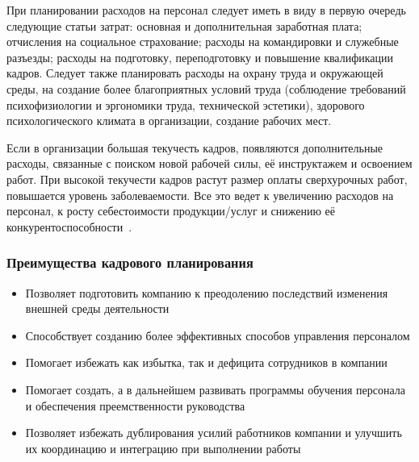 \documentclass{../industrial-development}
\begin{document}
	При планировании расходов на персонал следует иметь в виду в первую очередь следующие статьи затрат: основная и дополнительная заработная плата; отчисления на социальное страхование; расходы на командировки и служебные разъезды; расходы на подготовку, переподготовку и повышение квалификации кадров. Следует также планировать расходы на охрану труда и окружающей среды, на создание более благоприятных условий труда (соблюдение требований психофизиологии и эргономики труда, технической эстетики), здорового психологического климата в организации, создание рабочих мест.
	
	Если в организации большая текучесть кадров, появляются дополнительные расходы, связанные с поиском новой рабочей силы, её инструктажем и освоением работ. При высокой текучести кадров растут размер оплаты сверхурочных работ, повышается уровень заболеваемости. Все это ведет к увеличению расходов на персонал, к росту себестоимости продукции/услуг и снижению её конкурентоспособности~\cite{Durakova}.
	
	\begin{frame} \frametitle{Преимущества кадрового планирования}
		\begin{itemize}
			\item Позволяет подготовить компанию к преодолению последствий изменения внешней среды деятельности
			\item	Способствует созданию более эффективных способов управления персоналом
			\item	Помогает избежать как избытка, так и дефицита сотрудников в компании
			\item	Помогает создать, а в дальнейшем развивать программы обучения персонала и обеспечения преемственности руководства
			\item	Позволяет избежать дублирования усилий работников компании и улучшить их координацию и интеграцию при выполнении работы 
		\end{itemize}
	\end{frame}
	
	\lecturenotes
	
\end{document}
